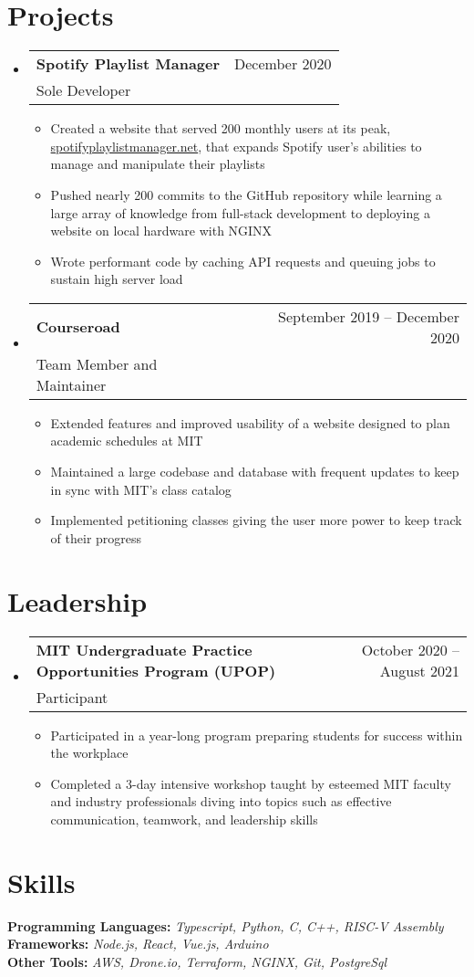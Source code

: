 \documentclass[letterpaper,12pt]{article} %
\makeatletter
\newcommand{\CVItem}[1]{
  \item\small{
    {#1 \vspace{-2pt}}
  }
}
\newcommand{\CVSubheading}[4]{
  \vspace{-2pt}\item
    \begin{tabular*}{0.97\textwidth}[t]{l@{\extracolsep{\fill}}r}
      \textbf{#1} & #2 \\
      \small#3 & \small #4 \\
    \end{tabular*}\vspace{-7pt}
}
\newcommand{\CVSubHeadingListStart}{\begin{itemize}[leftmargin=0.15in, label={}]} %
\newcommand{\CVSubHeadingListEnd}{\end{itemize}}
\newcommand{\CVItemListStart}{\begin{itemize}}
\newcommand{\CVItemListEnd}{\end{itemize}\vspace{-5pt}}
\makeatother
\begin{document}
\vspace{-10pt} %
\section{Projects}
\CVSubHeadingListStart
\CVSubheading
{Spotify Playlist Manager}{December 2020}
{Sole Developer}{}
\CVItemListStart
\CVItem{Created a website that served 200 monthly users at its peak, \href{www.spotifyplaylistmanager.net}{spotifyplaylistmanager.net},
  that expands Spotify user's abilities to manage and manipulate their playlists}
\CVItem{Pushed nearly 200 commits to the GitHub repository
while learning a large array of knowledge from full-stack development to deploying a website on local hardware with NGINX}
\CVItem{Wrote performant code by caching API requests and queuing jobs to sustain high server load}
\CVItemListEnd
\CVSubheading
{Courseroad}{September 2019 -- December 2020}
{Team Member and Maintainer}{}
\CVItemListStart
\CVItem{Extended features and improved usability of a website designed to plan academic schedules at MIT}
\CVItem{Maintained a large codebase and database with frequent updates to keep in sync with MIT's class catalog}
\CVItem{Implemented petitioning classes giving the user more power to keep track of their progress}
\CVItemListEnd
\CVSubHeadingListEnd

\vspace{-10pt} %
\section{Leadership}
\CVSubHeadingListStart
\CVSubheading
{MIT Undergraduate Practice Opportunities Program (UPOP)}{October 2020 -- August 2021}
{Participant}{}
\CVItemListStart
\CVItem{Participated in a year-long program preparing students for success within the workplace}
\CVItem{Completed a 3-day intensive workshop taught by esteemed MIT faculty and industry professionals
  diving into topics such as effective communication, teamwork, and leadership skills}
\CVItemListEnd
\CVSubHeadingListEnd

\vspace{-10pt} %

\section{Skills}
\begin{itemize}[leftmargin=0.15in, label={}]
  \small{\item{
        \textbf{Programming Languages: }{\emph{Typescript, Python, C, C++, RISC-V Assembly}} \\
        \textbf{Frameworks: }{\emph{Node.js, React, Vue.js, Arduino}}\\
        \textbf{Other Tools: }{\emph{AWS, Drone.io, Terraform, NGINX, Git, PostgreSql}} \\
        }}
\end{itemize}

\end{document}
